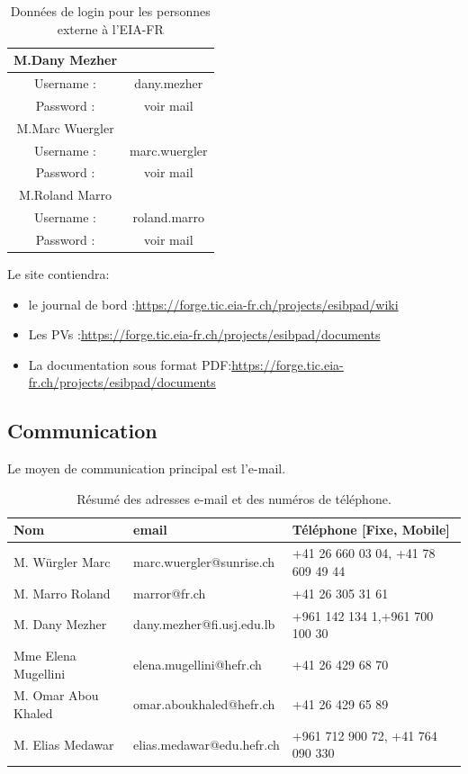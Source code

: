 		\begin{table}[H]
			\centering
			\begin{tabular}{|c|c|}
				\hline M.Dany Mezher &  \\ 
				\hline   Username : &  dany.mezher   \\ 
				\hline   Password : & voir mail     \\ [0.2cm]
				\hline M.Marc Wuergler & \\ 
				\hline   Username : &  marc.wuergler  \\ 
				\hline   Password : & voir mail \\ [0.2cm]
				\hline M.Roland Marro &  \\ 
				\hline   Username :&  roland.marro  \\ 
				\hline   Password : & voir mail     \\
				\hline
			\end{tabular} 
			\caption{\label{tab.login}Données de login pour les personnes externe à l'EIA-FR}
		\end{table}
	
		Le site contiendra:
	 	\begin{itemize}
	 		\item le journal de bord :\url{https://forge.tic.eia-fr.ch/projects/esibpad/wiki}
			\item Les PVs :\url{https://forge.tic.eia-fr.ch/projects/esibpad/documents} 
			\item La documentation sous format PDF:\url{https://forge.tic.eia-fr.ch/projects/esibpad/documents} 
		\end{itemize}
	\subsection{Communication}
		Le moyen de communication principal est l'e-mail.\\
		\begin{table}[H]
			\begin{tabular}{|l|l|l|}
				\hline  Nom & email  & Téléphone [Fixe, Mobile]  \\ 
				\hline M. Würgler Marc & marc.wuergler@sunrise.ch  & +41 26 660 03 04, +41 78 609 49 44  \\ 
				\hline M. Marro Roland & marror@fr.ch  & +41 26 305 31 61  \\ 
				\hline M. Dany Mezher	& dany.mezher@fi.usj.edu.lb & +961 142 134 1,+961 700 100 30  \\ 
				\hline Mme Elena Mugellini & elena.mugellini@hefr.ch &  +41 26 429 68 70\\ 
				\hline M. Omar Abou Khaled & omar.aboukhaled@hefr.ch  &  +41 26 429 65 89\\ 
				\hline M. Elias Medawar & elias.medawar@edu.hefr.ch  &  +961 712 900 72, +41 764 090 330\\ 
				\hline 
			\end{tabular} 
			\caption{Résumé des adresses e-mail et des numéros de téléphone.}			
		\end{table}
	
